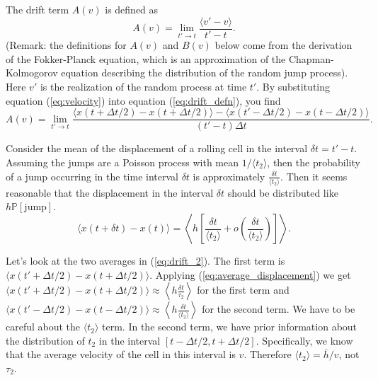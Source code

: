 \documentclass[
10pt, %
letterpaper, %
twocolumn, %
landscape %
]{article}
\begin{document}
The drift term $A(v)$ is defined as
\begin{equation}
  \label{eq:drift_defn}
  A(v) = \lim_{t' \rightarrow t}\frac{\langle v' - v\rangle}{t' - t}.
\end{equation}
(Remark: the definitions for $A(v)$ and $B(v)$ below come from the
derivation of the Fokker-Planck equation, which is an approximation of
the Chapman-Kolmogorov equation describing the distribution of the
random jump process). Here $v'$ is the realization of the random
process at time $t'$. By substituting equation (\ref{eq:velocity})
into equation (\ref{eq:drift_defn}), you find
\begin{equation}
  \label{eq:drift_2}
  A(v) = \lim_{t' \rightarrow t}\frac{\langle x(t + \Delta t/2) - x(t
    + \Delta t/2)\rangle - \langle x(t' - \Delta t/2) - x(t - \Delta
    t/2)\rangle}{(t' - t)\Delta t}.
\end{equation}

Consider the mean of the displacement of a rolling cell in the
interval $\delta t = t' - t$. Assuming the jumps are a Poisson process
with mean $1/\langle t_2 \rangle$, then the probability of a jump
occurring in the time interval $\delta t$ is approximately
$\frac{\delta t}{\langle t_2 \rangle}$. Then it seems reasonable that
the displacement in the interval $\delta t$ should be distributed like
$h \mathbb{P}[\text{jump}]$. 
\begin{equation}
  \label{eq:average_displacement}
  \langle x(t + \delta t) - x(t) \rangle = \left\langle h
    \left[\frac{\delta t}{\langle t_2 \rangle} + o\left(\frac{\delta
          t}{\langle t_2 \rangle}\right) \right] \right\rangle.
\end{equation}

Let's look at the two averages in (\ref{eq:drift_2}). The first term
is $\langle x(t' + \Delta t/2) - x(t + \Delta t/2)\rangle$. Applying
(\ref{eq:average_displacement}) we get $\langle x(t' + \Delta t/2) -
x(t + \Delta t/2) \rangle \approx \left\langle h \frac{\delta
    t}{\tau_2}\right\rangle$ for the first term and $\langle x(t' -
\Delta t/2) - x(t - \Delta t/2)\rangle \approx \left\langle h
  \frac{\delta t}{\langle t_2 \rangle} \right\rangle$ for the second
term. We have to be careful about the $\langle t_2 \rangle$ term. In
the second term, we have prior information about the distribution of
$t_2$ in the interval $[t - \Delta t/2, t + \Delta
t/2]$. Specifically, we know that the average velocity of the cell in
this interval is $v$. Therefore $\langle t_2 \rangle = \bar{h}/v$,
not $\tau_2$. 
\end{document}
